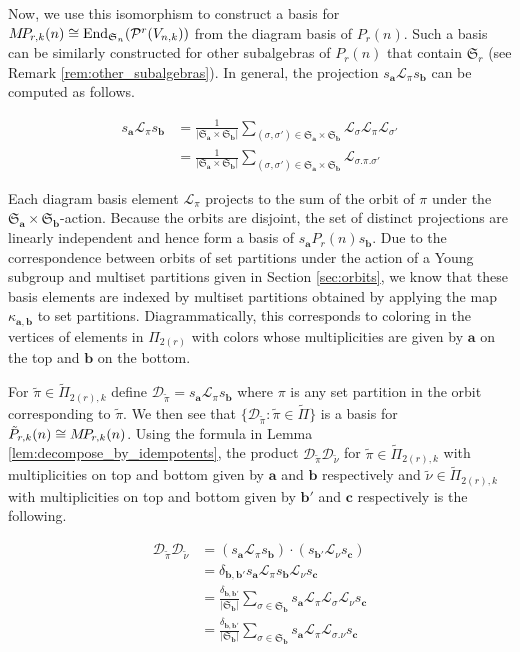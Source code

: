 \documentclass[10pt]{amsart}
\theoremstyle{definition}
\theoremstyle{definition}
\theoremstyle{plain}
\theoremstyle{remark}
\theoremstyle{plain}
\theoremstyle{plain}
\newcommand{\DD}{\mathcal{D}}
\newcommand{\LL}{\mathcal{L}}
\newcommand{\PP}{\mathcal{P}}
\newcommand{\SG}{\mathfrak{S}}
\newcommand{\bfa}{{\boldsymbol{a}}}
\newcommand{\bfb}{{\boldsymbol{b}}}
\newcommand{\bfc}{{\boldsymbol{c}}}
\newcommand{\MP}{{\rm M\!P\!}}
\newcommand{\tpi}{{\tilde{\pi}}}
\newcommand{\tnu}{{\tilde{\nu}}}
\newcommand{\abs}[1]{\left| #1\right |}
\DeclareMathOperator{\End}{End}
\begin{document}
Now, we use this isomorphism to construct a basis for $\MP_{r,k}(n)\cong\End_{\SG_n}(\PP^r(V_{n,k}))$ from the diagram basis of $P_r(n)$. Such a basis can be similarly constructed for other subalgebras of $P_r(n)$ that contain $\SG_r$ (see Remark \ref{rem:other_subalgebras}). In general, the projection $s_\bfa \LL_\pi s_\bfb$ can be computed as follows.

\begin{align*}
    s_\bfa\LL_\pi s_\bfb&=\frac{1}{\abs{\SG_\bfa\times\SG_\bfb}}\sum_{(\sigma,\sigma')\in \SG_\bfa\times\SG_\bfb} \LL_\sigma\LL_\pi\LL_{\sigma'}\\
    &=\frac{1}{\abs{\SG_\bfa\times\SG_\bfb}}\sum_{(\sigma,\sigma')\in \SG_\bfa\times\SG_\bfb} \LL_{\sigma.\pi.\sigma'}
\end{align*}

Each diagram basis element $\LL_\pi$ projects to the sum of the orbit of $\pi$ under the $\SG_\bfa\times\SG_{\bfb}$-action. Because the orbits are disjoint, the set of distinct projections are linearly independent and hence form a basis of $s_\bfa P_r(n) s_\bfb$. Due to the correspondence between orbits of set partitions under the action of a Young subgroup and multiset partitions given in Section \ref{sec:orbits}, we know that these basis elements are indexed by multiset partitions obtained by applying the map $\kappa_{\bfa,\bfb}$ to set partitions. Diagrammatically, this corresponds to coloring in the vertices of elements in $\Pi_{2(r)}$ with colors whose multiplicities are given by $\bfa$ on the top and $\bfb$ on the bottom.

For $\tpi\in\tilde\Pi_{2(r),k}$ define $\DD_\tpi=s_\bfa\LL_\pi s_\bfb$ where $\pi$ is any set partition in the orbit corresponding to $\tpi$. We then see that $\{\DD_\tpi:\tpi\in\tilde\Pi\}$ is a basis for $\tilde{P}_{r,k}(n)\cong \MP_{r,k}(n)$. Using the formula in Lemma \ref{lem:decompose_by_idempotents}, the product $\DD_\tpi\DD_\tnu$ for $\tpi\in\tilde\Pi_{2(r),k}$ with multiplicities on top and bottom given by $\bfa$ and $\bfb$ respectively and $\tnu\in\tilde\Pi_{2(r),k}$ with multiplicities on top and bottom given by $\bfb'$ and $\bfc$ respectively is the following.

\begin{align*}
    \DD_\tpi\DD_\tnu&=(s_\bfa\LL_\pi s_\bfb)\cdot(s_{\bfb'}\LL_\nu s_\bfc)\\
    &=\delta_{\bfb,\bfb'}s_\bfa\LL_\pi s_\bfb \LL_\nu s_\bfc\\
    &=\frac{\delta_{\bfb,\bfb'}}{\abs{\SG_\bfb}}\sum_{\sigma\in\SG_\bfb}s_\bfa\LL_\pi\LL_\sigma\LL_\nu s_\bfc\\
    &=\frac{\delta_{\bfb,\bfb'}}{\abs{\SG_\bfb}}\sum_{\sigma\in\SG_\bfb}s_\bfa\LL_\pi\LL_{
    \sigma.\nu} s_\bfc
\end{align*}
\end{document}
